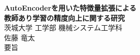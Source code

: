 \begin{center}
  \textbf{{\LARGE AutoEncoderを用いた特徴量拡張による\\教師あり学習の精度向上に関する研究\\}}
  \vspace{5mm}
  {\large 茨城大学 工学部 機械システム工学科\\
  佐藤 竜太\\}
  \vspace{5mm}
  {\large 要旨}
  \vspace{5mm}
\end{center}

\newpage
